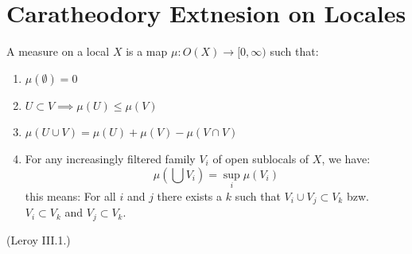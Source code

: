 \section{Caratheodory Extnesion on Locales}\label{sec:leroy-chapter-iii}
\begin{definition}
    \label{def:measure_on_locals}
    \leanok
    A measure on a local $X$ is a map $\mu : O(X) \to [0,\infty)$ such that:
    \begin{enumerate}
        \item $\mu(\emptyset) = 0$
        \item $U \subset V \implies \mu(U) \le \mu(V)$
        \item $\mu(U \cup V) = \mu(U) + \mu(V) - \mu(V \cap V)$
        \item For any increasingly filtered family $V_i$ of open sublocals of $X$, we have:
        \[\mu(\bigcup V_i) = \sup_i \mu(V_i)\] this means:
        For all $i$ and $j$ there exists a $k$ such that $V_i \cup V_j \subset V_k$ bzw. $V_i \subset V_k$ and $V_j \subset V_k$.
    \end{enumerate}
    (Leroy III.1.)
\end{definition}

